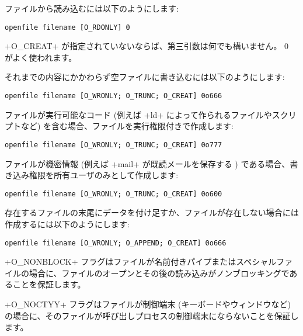 \begin{example}
ファイルから読み込むには以下のようにします:
%
\begin{lstlisting}
openfile filename [O_RDONLY] 0
\end{lstlisting}
%
\ml+O_CREAT+ が指定されていないならば、第三引数は何でも構いません。 0 がよく使われます。

それまでの内容にかかわらず空ファイルに書き込むには以下のようにします:
%
\begin{lstlisting}
openfile filename [O_WRONLY; O_TRUNC; O_CREAT] 0o666
\end{lstlisting}
%
ファイルが実行可能なコード (例えば \ml+ld+ によって作られるファイルやスクリプトなど) を含む場合、ファイルを実行権限付きで作成します:
%
\begin{lstlisting}
openfile filename [O_WRONLY; O_TRUNC; O_CREAT] 0o777
\end{lstlisting}
%
ファイルが機密情報 (例えば \ml+mail+ が既読メールを保存する ) である場合、書き込み権限を所有ユーザのみとして作成します:
%
\begin{lstlisting}
openfile filename [O_WRONLY; O_TRUNC; O_CREAT] 0o600
\end{lstlisting}
%
存在するファイルの末尾にデータを付け足すか、ファイルが存在しない場合には作成するには以下のようにします:
%
\begin{lstlisting}
openfile filename [O_WRONLY; O_APPEND; O_CREAT] 0o666
\end{lstlisting}
\end{example}

\ml+O_NONBLOCK+ フラグはファイルが名前付きパイプまたはスペシャルファイルの場合に、ファイルのオープンとその後の読み込みがノンブロッキングであることを保証します。

\ml+O_NOCTYY+ フラグはファイルが制御端末 (キーボードやウィンドウなど) の場合に、そのファイルが呼び出しプロセスの制御端末にならないことを保証します。

